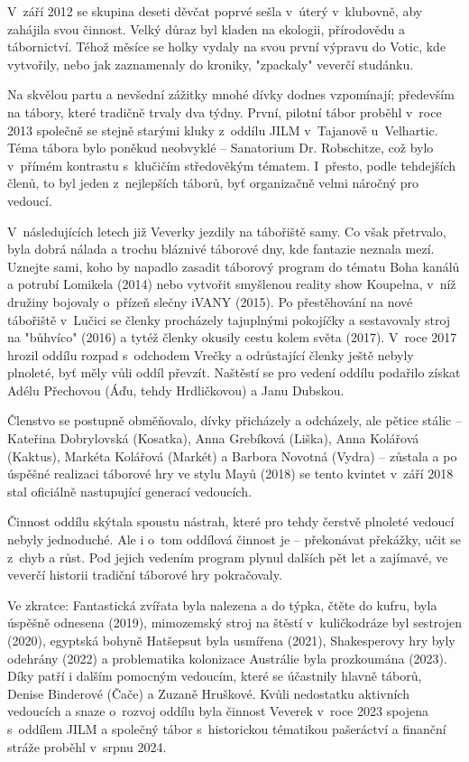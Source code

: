 \documentclass[a5paper, 11pt, twoside]{article}
\begin{document}
V~září 2012 se skupina deseti děvčat poprvé sešla v~úterý v~klubovně,
aby zahájila svou činnost. Velký důraz byl kladen na ekologii,
přírodovědu a tábornictví. Téhož měsíce se holky vydaly na svou první
výpravu do Votic, kde vytvořily, nebo jak zaznamenaly do kroniky,
"zpackaly" veverčí studánku.

Na skvělou partu a nevšední zážitky mnohé dívky dodnes vzpomínají;
především na tábory, které tradičně trvaly dva týdny. První, pilotní
tábor proběhl v~roce 2013 společně se stejně starými kluky z~oddílu JILM
v~Tajanově u~Velhartic. Téma tábora bylo poněkud neobvyklé -- Sanatorium
Dr. Robschitze, což bylo v~přímém kontrastu s~klučičím středověkým
tématem. I~přesto, podle tehdejších členů, to byl jeden z~nejlepších
táborů, byť organizačně velmi náročný pro vedoucí.

V~následujících letech již Veverky jezdily na tábořiště samy. Co však
přetrvalo, byla dobrá nálada a trochu bláznivé táborové dny, kde
fantazie neznala mezí. Uznejte sami, koho by napadlo zasadit táborový
program do tématu Boha kanálů a potrubí Lomikela (2014) nebo vytvořit
smyšlenou reality show Koupelna, v~níž družiny bojovaly o~přízeň slečny
iVANY (2015). Po přestěhování na nové tábořiště v~Lučici se členky
procházely tajuplnými pokojíčky a sestavovaly stroj na "bůhvíco" (2016)
a tytéž členky okusily cestu kolem světa (2017). V~roce 2017 hrozil
oddílu rozpad s~odchodem Vrečky a odrůstající členky ještě nebyly
plnoleté, byť měly vůli oddíl převzít. Naštěstí se pro vedení oddílu
podařilo získat Adélu Přechovou (Áďu, tehdy Hrdličkovou) a Janu Dubskou.

Členstvo se postupně obměňovalo, dívky přicházely a odcházely, ale
pětice stálic -- Kateřina Dobrylovská (Kosatka), Anna Grebíková (Liška),
Anna Kolářová (Kaktus), Markéta Kolářová (Markét) a Barbora Novotná
(Vydra) -- zůstala a po úspěšné realizaci táborové hry ve stylu Mayů
(2018) se tento kvintet v~září 2018 stal oficiálně nastupující generací
vedoucích.

Činnost oddílu skýtala spoustu nástrah, které pro tehdy čerstvě plnoleté
vedoucí nebyly jednoduché. Ale i o~tom oddílová činnost je -- překonávat
překážky, učit se z~chyb a růst. Pod jejich vedením program plynul
dalších pět let a zajímavé, ve veverčí historii tradiční táborové hry
pokračovaly.

Ve zkratce: Fantastická zvířata byla nalezena a do týpka, čtěte do
kufru, byla úspěšně odnesena (2019), mimozemský stroj na štěstí
v~kuličkodráze byl sestrojen (2020), egyptská bohyně Hatšepsut byla
usmířena (2021), Shakesperovy hry byly odehrány (2022) a problematika
kolonizace Austrálie byla prozkoumána (2023). Díky patří i dalším
pomocným vedoucím, které se účastnily hlavně táborů, Denise Binderové
(Čače) a Zuzaně Hruškové. Kvůli nedostatku aktivních vedoucích a snaze
o~rozvoj oddílu byla činnost Veverek v~roce 2023 spojena s~oddílem JILM a
společný tábor s~historickou tématikou pašeráctví a finanční stráže
proběhl v~srpnu 2024.
\end{document}
